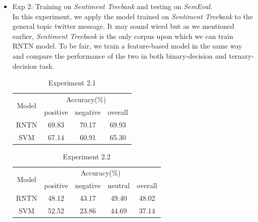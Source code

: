 \begin{itemize}
\item Exp 2: Training on \textit{Sentiment Treebank} and testing on \textit{SemEval}. \\ 
In this experiment, we apply the model trained on \textit{Sentiment Treebank} to the general topic twitter message. It may sound wierd but as we mentioned earlier, \textit{Sentiment Treebank} is the only corpus upon which we can train RNTN model. To be fair, we train a feature-based model in the same way and compare the performance of the two in both binary-decision and ternary-decision task. 
\begin{table}[H]
  \begin{center}
    \begin{tabular}{cccc}\hline
      \multirow{2}{*}{Model} 
      & \multicolumn{3}{c}{Accuracy(\%)} \\\cline{2-4}
    & positive & negative & overall \\ \hline
    RNTN  & 69.83     &   70.17	    &   69.93    \\ 
    SVM   & 67.14     &   60.91     &   65.30      \\ \hline
    \end{tabular}
    \end{center}
    \caption{\label{exp5_2_1} Experiment 2.1}
\end{table}

\begin{table}[H]
  \begin{center}
    \begin{tabular}{ccccc}\hline
      \multirow{2}{*}{Model} 
      & \multicolumn{4}{c}{Accuracy(\%)} \\\cline{2-5}
    & positive & negative & neutral & overall \\ \hline
    RNTN  & 48.12    &   43.17  	   &   49.40       & 48.02    \\ 
    SVM   & 52.52    &   23.86     &   44.69       & 37.14    \\ \hline
    \end{tabular}
    \end{center}
    \caption{\label{exp5_2_2} Experiment 2.2}
\end{table}


\end{itemize}
